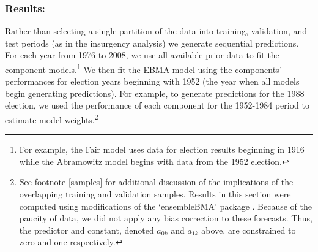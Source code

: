 \documentclass[12pt,fullpage,endnotes]{article}
\newcommand{\note}[1]{\footnote{ #1 \vspace{4 mm}}}
\begin{document}
\subsubsection{Results:}

Rather than selecting a single partition of the data into training,
validation, and test periods (as in the insurgency analysis) we
generate sequential predictions.  For each year from 1976 to 2008, we
use all available prior data to fit the component models.\note{For
  example, the Fair model uses data for election results beginning in
  1916 while the Abramowitz model begins with data from the 1952
  election. }  We then fit the EBMA model using the components'
performances for election years beginning with 1952 (the year when all
models begin generating predictions).  For example, to generate
predictions for the 1988 election, we used the performance of each
component for the 1952-1984 period to estimate model weights.\note{See
  footnote \ref{samples} for additional discussion of the implications
  of the overlapping training and validation samples.  Results in this
  section were computed using modifications of the `ensembleBMA'
  package \citep{Fraley:2010b, Fraley:Forthcoming}.  Because of the
  paucity of data, we did not apply any bias correction to these
  forecasts.  Thus, the predictor and constant, denoted $a_{0k}$ and
  $a_{1k}$ above, are constrained to zero and one respectively.}
\end{document}
